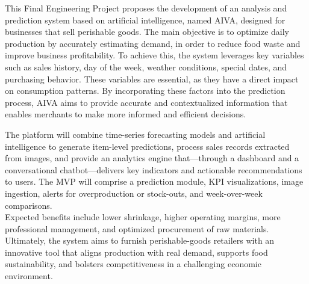 \begin{Abstract}

    This Final Engineering Project proposes the development of an analysis and prediction system based on artificial intelligence, named AIVA, designed for businesses that sell perishable goods. The main objective is to optimize daily production by accurately estimating demand, in order to reduce food waste and improve business profitability. To achieve this, the system leverages key variables such as sales history, day of the week, weather conditions, special dates, and purchasing behavior. These variables are essential, as they have a direct impact on consumption patterns. By incorporating these factors into the prediction process, AIVA aims to provide accurate and contextualized information that enables merchants to make more informed and efficient decisions.
    
    The platform will combine time-series forecasting models and artificial intelligence to generate item-level predictions, process sales records extracted from images, and provide an analytics engine that—through a dashboard and a conversational chatbot—delivers key indicators and actionable recommendations to users. The MVP will comprise a prediction module, KPI visualizations, image ingestion, alerts for overproduction or stock-outs, and week-over-week comparisons.\\
    
    Expected benefits include lower shrinkage, higher operating margins, more professional management, and optimized procurement of raw materials. Ultimately, the system aims to furnish perishable-goods retailers with an innovative tool that aligns production with real demand, supports food sustainability, and bolsters competitiveness in a challenging economic environment.

\end{Abstract}